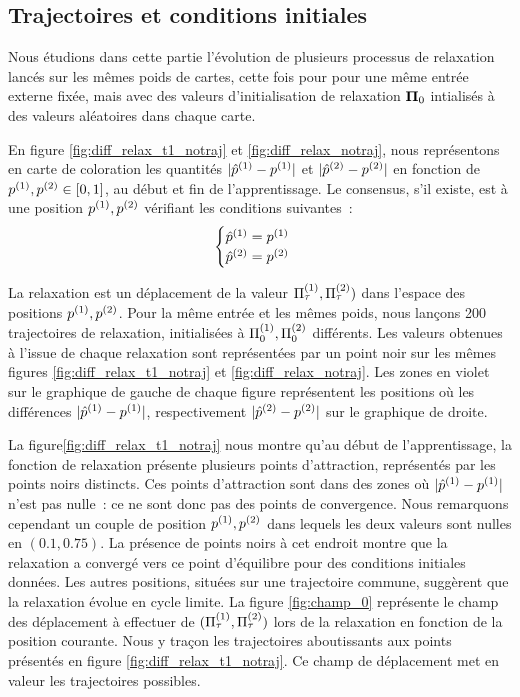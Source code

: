 \documentclass[../main]{subfiles}
\begin{document}
\subsection{Trajectoires et conditions initiales \label{sec:pf}}

Nous étudions dans cette partie l'évolution de plusieurs processus de relaxation lancés sur les mêmes poids de cartes, cette fois pour pour une même entrée externe fixée, mais avec  des valeurs d'initialisation de relaxation $\mathbf{\Pi}_0$ intialisés à des valeurs aléatoires dans chaque carte.

En figure \ref{fig:diff_relax_t1_notraj} et \ref{fig:diff_relax_notraj}, nous représentons en carte de coloration les quantités $\lvert \hat{p}^{({1})} - p^{({1})} \rvert$ et $\lvert \hat{p}^{({2})} - p^{({2})}\rvert$ en fonction de $p^{({1})},p^{({2})} \in [0,1]$, au début et fin de l'apprentissage.
Le consensus, s'il existe, est à une position $p^{({1})},p^{({2})}$ vérifiant les conditions suivantes~:
\begin{equation*}
\begin{cases}
\hat{p}^{({1})} = p^{({1})}\\
\hat{p}^{({2})} = p^{({2})}\\
\end{cases}
\end{equation*}

La relaxation est un déplacement de la valeur $\Pi^{({1})}_\tau, \Pi^{({2})}_\tau)$ dans l'espace des positions $p^{({1})}, p^{({2})}$. Pour la même entrée et les mêmes poids, nous lançons 200 trajectoires de relaxation, initialisées à $\Pi^{({1})}_0,\Pi^{({2})}_0$ différents.
Les valeurs obtenues à l'issue de chaque relaxation sont représentées par un point noir sur les mêmes figures \ref{fig:diff_relax_t1_notraj} et \ref{fig:diff_relax_notraj}. 
Les zones en violet sur le graphique de gauche de chaque figure représentent les positions où les différences $\lvert \hat{p}^{({1})} - p^{({1})} \rvert$, respectivement $\lvert \hat{p}^{({2})} - p^{({2})}\rvert$ sur le graphique de droite.

La figure\ref{fig:diff_relax_t1_notraj} nous montre qu'au début de l'apprentissage, la fonction de relaxation présente plusieurs points d'attraction, représentés par les points noirs distincts. 
Ces points d'attraction sont dans des zones où $\lvert \hat{p}^{({1})} - p^{({1})} \rvert$ n'est pas nulle~: ce ne sont donc pas des points de convergence. 
Nous remarquons cependant un couple de position $p^{({1})}, p^{({2})}$ dans lequels les deux valeurs sont nulles en $(0.1, 0.75)$. La présence de points noirs à cet endroit montre que la relaxation a convergé vers ce point d'équilibre pour des conditions initiales données. Les autres positions, situées sur une trajectoire commune, suggèrent que la relaxation évolue en cycle limite.
La figure \ref{fig:champ_0} représente le champ des déplacement à effectuer de $(\Pi^{({1})}_\tau,\Pi^{({2})}_\tau)$ lors de la relaxation en fonction de la position courante. Nous y traçon les trajectoires aboutissants aux points présentés en figure \ref{fig:diff_relax_t1_notraj}.
Ce champ de déplacement met en valeur les trajectoires possibles. 
\end{document}
